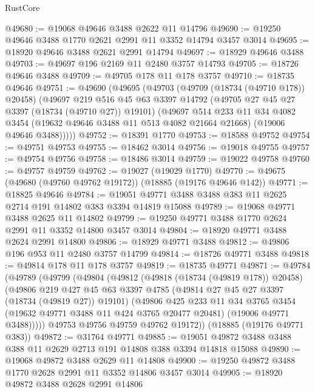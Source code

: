 \begin{lexlean}{RustCore}
\begin{coremodule}
@49680 := @19068 @49646 @3488 @2622 @11 @14796
@49690 := @19250 @49646 @3488 @1770 @2621 @2991 @11 @3352 @14794 @3457 @3014
@49695 := @18920 @49646 @3488 @2621 @2991 @14794
@49697 := @18929 @49646 @3488
@49703 := @49697 @196 @2169 @11 @2480 @3757 @14793
@49705 := @18726 @49646 @3488
@49709 := @49705 @178 @11 @178 @3757
@49710 := @18735 @49646
@49751 := @49690
    (@49695
      (@49703
        (@49709 (@18734 (@49710 @178)) @20458)
        (@49697
          @219
          @516
          @45
          @63
          @3397
          @14792
          (@49705 @27 @45 @27 @3397 (@18734 (@49710 @27)) @19101)
          (@49697
            @514
            @233
            @11
            @34
            @4082
            @3454
            (@19632 @49646 @3488 @11 @513 @4082 @21664 @21668)
            (@19006 @49646 @3488)))))
@49752 := @18391 @1770
@49753 := @18588 @49752
@49754 := @49751 @49753
@49755 := @18462 @3014
@49756 := @19018 @49755
@49757 := @49754 @49756
@49758 := @18486 @3014
@49759 := @19022 @49758
@49760 := @49757 @49759
@49762 := @19027 (@19029 @1770)
@49770 := @49675 (@49680 (@49760 @49762 @19172)) (@18885 (@19176 @49646 @142))
@49771 := @18825 @49646
@49784 := @19051 @49771 @3488 @3488 @383 @11 @2625 @2714 @191 @14802 @383 @3394 @14819 @15088
@49789 := @19068 @49771 @3488 @2625 @11 @14802
@49799 := @19250 @49771 @3488 @1770 @2624 @2991 @11 @3352 @14800 @3457 @3014
@49804 := @18920 @49771 @3488 @2624 @2991 @14800
@49806 := @18929 @49771 @3488
@49812 := @49806 @196 @953 @11 @2480 @3757 @14799
@49814 := @18726 @49771 @3488
@49818 := @49814 @178 @11 @178 @3757
@49819 := @18735 @49771
@49871 := @49784
    (@49789
      (@49799
        (@49804
          (@49812
            (@49818 (@18734 (@49819 @178)) @20458)
            (@49806
              @219
              @427
              @45
              @63
              @3397
              @4785
              (@49814 @27 @45 @27 @3397 (@18734 (@49819 @27)) @19101)
              (@49806
                @425
                @233
                @11
                @34
                @3765
                @3454
                (@19632 @49771 @3488 @11 @424 @3765 @20477 @20481)
                (@19006 @49771 @3488)))))
        @49753
        @49756
        @49759
        @49762
        @19172))
    (@18885 (@19176 @49771 @383))
@49872 := @31764 @49771
@49885 := @19051 @49872 @3488 @3488 @388 @11 @2629 @2713 @191 @14808 @388 @3394 @14818 @15088
@49890 := @19068 @49872 @3488 @2629 @11 @14808
@49900 := @19250 @49872 @3488 @1770 @2628 @2991 @11 @3352 @14806 @3457 @3014
@49905 := @18920 @49872 @3488 @2628 @2991 @14806

\end{coremodule}
\end{lexlean}
